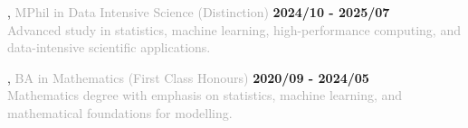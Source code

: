 

, \textcolor{darkgray}{MPhil in Data Intensive Science (Distinction)} \hfill \textbf{2024/10 - 2025/07}\\

\textcolor{darkgray}{Advanced study in statistics, machine learning, high-performance computing, and data-intensive scientific applications.}
\vspace{0.2em}

, \textcolor{darkgray}{BA in Mathematics (First Class Honours) \hfill} \textbf{2020/09 - 2024/05}\\

\textcolor{darkgray}{
Mathematics degree with emphasis on statistics, machine learning, and mathematical foundations for modelling.
}

